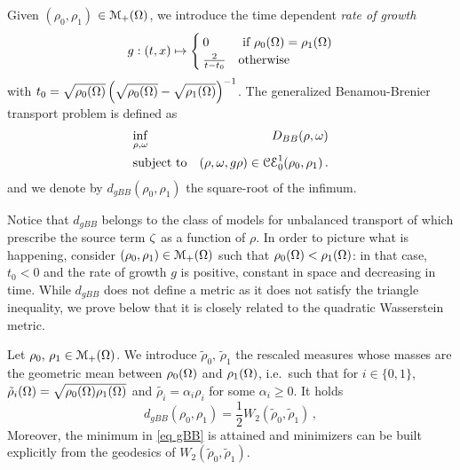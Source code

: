 \begin{definition}
Given $(\rho_0,\rho_1)$ $\in \mathcal{M}_+(\Omega)$, we introduce the time dependent \emph{rate of growth}
\begin{equation}
\label{rate of growth}
g: (t,x) \mapsto 
\begin{cases}
0 &\text{ if $\rho_0(\Om)=\rho_1(\Om)$} \\
\frac{2}{t-t_0} & \text{otherwise}
\end{cases}
\end{equation}
with $t_0=\sqrt{\rho_0(\Omega)}\left( \sqrt{\rho_0(\Omega)}-\sqrt{\rho_1(\Omega)}\right)^{-1}$. The generalized Benamou-Brenier transport problem is defined as
\begin{eqnarray} %
\label{eq gBB}
& \underset{\rho,\M}{\inf} &D_{BB}(\rho,\M) \\
& \text{subject to}  & (\rho,\M,g \rho) \in \ccons\, . 
\end{eqnarray}
and we denote by $d_{gBB}(\rho_0,\rho_1)$ the square-root of the infimum.
\end{definition}

Notice that $d_{gBB}$ belongs to the class of models for unbalanced transport of \cite{lombardi2013eulerian} which prescribe the source term $\zeta$ as a function of $\rho$. In order to picture what is happening, consider $(\rho_0,\rho_1)\in \mathcal{M}_+(\Omega)$ such that $\rho_0(\Omega) < \rho_1(\Omega)$: in that case, $t_0<0$ and the rate of growth $g$ is positive, constant in space and decreasing in time.
%
While $d_{gBB}$ does not define a metric as it does not satisfy the triangle inequality, we prove below that it is closely related to the quadratic Wasserstein metric.
%
\begin{proposition}
Let $\rho_0,\, \rho_1 \in \mathcal{M}_+(\Omega)$. We introduce $\tilde{\rho}_0, \, \tilde{\rho}_1$ the rescaled measures whose masses are the geometric mean between $\rho_0(\Omega)$ and $\rho_1(\Omega)$, i.e.\ such that for $i\in \{0,1\}$, $\tilde{\rho}_i(\Omega)=\sqrt{\rho_0(\Omega)\rho_1(\Omega)}$ and $\tilde{\rho_i} = \alpha_i \rho_i$ for some $\alpha_i \geq 0$. It holds
\[
d_{gBB}(\rho_0,\rho_1) = \frac12 W_2(\tilde{\rho}_0,\tilde{\rho}_1) \, ,
\]
Moreover, the minimum in \eqref{eq gBB} is attained and minimizers can be built explicitly from the geodesics of $W_2(\tilde{\rho}_0,\tilde{\rho}_1)$.
\end{proposition}

